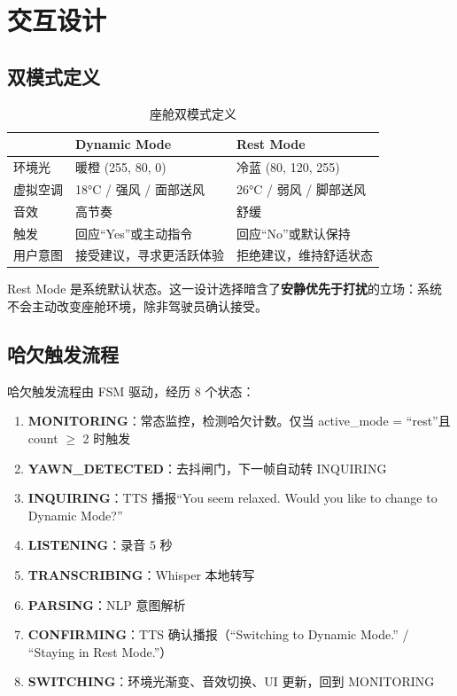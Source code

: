 \documentclass[12pt,a4paper]{ctexart}
\begin{document}
\section{交互设计}

\subsection{双模式定义}

\begin{table}[htbp]
\centering
\caption{座舱双模式定义}
\begin{tabular}{@{}p{2.5cm}p{4cm}p{4cm}@{}}
\toprule
& \textbf{Dynamic Mode} & \textbf{Rest Mode} \\
\midrule
环境光   & 暖橙 (255, 80, 0)    & 冷蓝 (80, 120, 255) \\
虚拟空调 & 18°C / 强风 / 面部送风       & 26°C / 弱风 / 脚部送风 \\
音效     & 高节奏             & 舒缓 \\
触发     & 回应“Yes”或主动指令 & 回应“No”或默认保持 \\
用户意图 & 接受建议，寻求更活跃体验 & 拒绝建议，维持舒适状态 \\
\bottomrule
\end{tabular}
\end{table}

Rest Mode 是系统默认状态。这一设计选择暗含了\textbf{安静优先于打扰}的立场：系统不会主动改变座舱环境，除非驾驶员确认接受。

\subsection{哈欠触发流程}

哈欠触发流程由 FSM 驱动，经历 8 个状态：

\begin{enumerate}[label=\arabic*.]
    \item \textbf{MONITORING}：常态监控，检测哈欠计数。仅当 active\_mode = “rest”且 count $\geq$ 2 时触发
    \item \textbf{YAWN\_DETECTED}：去抖闸门，下一帧自动转 INQUIRING
    \item \textbf{INQUIRING}：TTS 播报“You seem relaxed. Would you like to change to Dynamic Mode?”
    \item \textbf{LISTENING}：录音 5 秒
    \item \textbf{TRANSCRIBING}：Whisper 本地转写
    \item \textbf{PARSING}：NLP 意图解析
    \item \textbf{CONFIRMING}：TTS 确认播报（“Switching to Dynamic Mode.” / “Staying in Rest Mode.”）
    \item \textbf{SWITCHING}：环境光渐变、音效切换、UI 更新，回到 MONITORING
\end{enumerate}
\end{document}
